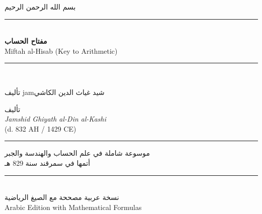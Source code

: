 \documentclass[11pt,a4paper]{book}
\newcommand{\ar}[1]{\arabicfont\beginR #1\endR}
\newcommand{\arLarge}[1]{{\Large\arabicfont\beginR #1\endR}}
\newenvironment{arabicbox}{%
  \begin{framed}
  \begin{minipage}{\linewidth-2\fboxsep-2\fboxrule}
  \setlength{\parindent}{0pt}
  \linespread{1.3}\selectfont
}{%
  \end{minipage}
  \end{framed}
}
\newcommand{\longline}{\noindent\rule{\textwidth}{0.4pt}}
\newcommand{\shortline}{\noindent\rule{0.5\textwidth}{0.4pt}\par}
\begin{document}
\thispagestyle{empty}
\begin{center}
\vspace*{1.5cm}

{\fontsize{14}{16}\selectfont\ar{بسم الله الرحمن الرحيم}}\\[0.8cm]

{\color{rulecolor}\longline}\\[0.6cm]

{\fontsize{28}{34}\selectfont\bfseries\color{titlecolor}
\ar{مفتاح الحساب}}\\[0.5cm]

{\fontsize{18}{22}\selectfont\color{sectioncolor}
Miftah al-Hisab (Key to Arithmetic)}\\[0.3cm]

{\color{rulecolor}\longline}\\[1cm]

\begin{arabicbox}
\begin{center}
\arLarge{تأليف jamشيد غياث الدين الكاشي}
\end{center}
\end{arabicbox}

\vspace{0.8cm}

{\Large\ar{تأليف}}\\[0.3cm]
{\Large\textit{Jamshid Ghiyath al-Din al-Kashi}}\\[0.2cm]
{\normalsize (d. 832 AH / 1429 CE)}\\[0.5cm]

{\color{rulecolor}\shortline}

\vspace{0.5cm}

{\small\ar{موسوعة شاملة في علم الحساب والهندسة والجبر}}\\[0.2cm]
{\small\ar{أتمها في سمرقند سنة 829 هـ}}\\[0.5cm]

{\color{rulecolor}\longline}\\[1cm]

{\footnotesize\ar{نسخة عربية مصححة مع الصيغ الرياضية}}\\[0.3cm]
{\footnotesize Arabic Edition with Mathematical Formulas}\\[1cm]

\end{center}
\clearpage
\end{document}
